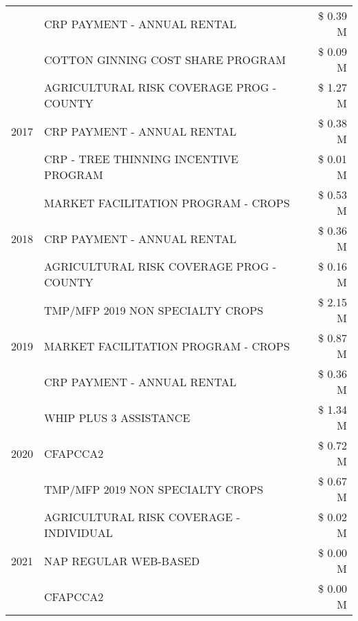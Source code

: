 \begin{tabular}{llr}
 & CRP PAYMENT - ANNUAL RENTAL & \$ 0.39 M \\
 & COTTON GINNING COST SHARE PROGRAM & \$ 0.09 M \\
\cline{1-3}
\multirow[t]{3}{*}{2017} & AGRICULTURAL RISK COVERAGE PROG - COUNTY & \$ 1.27 M \\
 & CRP PAYMENT - ANNUAL RENTAL & \$ 0.38 M \\
 & CRP - TREE THINNING INCENTIVE PROGRAM & \$ 0.01 M \\
\cline{1-3}
\multirow[t]{3}{*}{2018} & MARKET FACILITATION PROGRAM - CROPS & \$ 0.53 M \\
 & CRP PAYMENT - ANNUAL RENTAL & \$ 0.36 M \\
 & AGRICULTURAL RISK COVERAGE PROG - COUNTY & \$ 0.16 M \\
\cline{1-3}
\multirow[t]{3}{*}{2019} & TMP/MFP 2019 NON SPECIALTY CROPS & \$ 2.15 M \\
 & MARKET FACILITATION PROGRAM - CROPS & \$ 0.87 M \\
 & CRP PAYMENT - ANNUAL RENTAL & \$ 0.36 M \\
\cline{1-3}
\multirow[t]{3}{*}{2020} & WHIP PLUS 3 ASSISTANCE & \$ 1.34 M \\
 & CFAPCCA2 & \$ 0.72 M \\
 & TMP/MFP 2019 NON SPECIALTY CROPS & \$ 0.67 M \\
\cline{1-3}
\multirow[t]{3}{*}{2021} & AGRICULTURAL RISK COVERAGE - INDIVIDUAL & \$ 0.02 M \\
 & NAP REGULAR WEB-BASED & \$ 0.00 M \\
 & CFAPCCA2 & \$ 0.00 M \\
\cline{1-3}
\bottomrule
\end{tabular}
